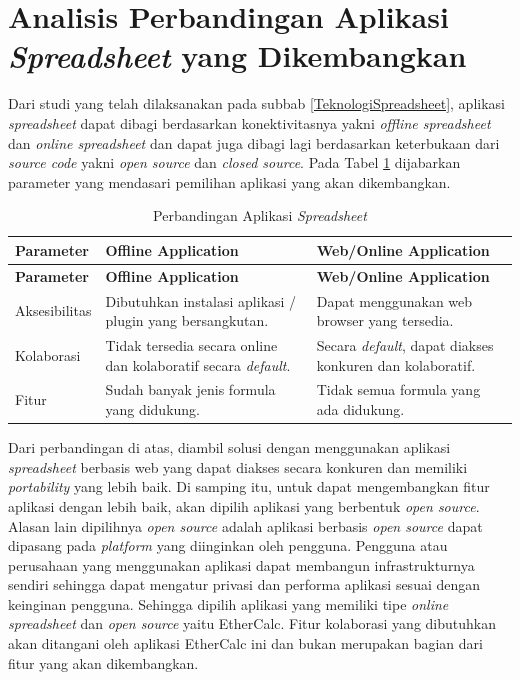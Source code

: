 \section{Analisis Perbandingan Aplikasi \textit{Spreadsheet} yang Dikembangkan}
Dari studi yang telah dilaksanakan pada subbab \ref{TeknologiSpreadsheet}, aplikasi \textit{spreadsheet} dapat dibagi berdasarkan konektivitasnya yakni \textit{offline spreadsheet} dan \textit{online spreadsheet} dan dapat juga dibagi lagi berdasarkan keterbukaan dari \textit{source code} yakni \textit{open source} dan \textit{closed source}. Pada Tabel \ref{AnalisisAplikasiDasar} dijabarkan parameter yang mendasari pemilihan aplikasi yang akan dikembangkan.

\begin{small}
\begin{longtable}{ | p{3cm} | p{4cm} | p{4cm} | }
    \caption{Perbandingan Aplikasi \textit{Spreadsheet}}
    \label{AnalisisAplikasiDasar}\\ \hline
    \centering\bfseries{Parameter} & \centering\bfseries{Offline Application} & \centering\bfseries{Web/Online Application} \tabularnewline \hline
    \endfirsthead
    \hline
    \centering\bfseries{Parameter} & \centering\bfseries{Offline Application} & \centering\bfseries{Web/Online Application} \tabularnewline \hline
    \endhead
    Aksesibilitas & Dibutuhkan instalasi aplikasi / plugin yang bersangkutan. & Dapat menggunakan web browser yang tersedia. \\ \hline
    Kolaborasi & Tidak tersedia secara online dan kolaboratif secara \textit{default}. & Secara \textit{default}, dapat diakses konkuren dan kolaboratif. \\ \hline
    Fitur & Sudah banyak jenis formula yang didukung. & Tidak semua formula yang ada didukung. \\ \hline
\end{longtable}
\end{small}

Dari perbandingan di atas, diambil solusi dengan menggunakan aplikasi \textit{spreadsheet} berbasis web yang dapat diakses secara konkuren dan memiliki \textit{portability} yang lebih baik. Di samping itu, untuk dapat mengembangkan fitur aplikasi dengan lebih baik, akan dipilih aplikasi yang berbentuk \textit{open source}. Alasan lain dipilihnya \textit{open source} adalah aplikasi berbasis \textit{open source} dapat dipasang pada \textit{platform} yang diinginkan oleh pengguna. Pengguna atau perusahaan yang menggunakan aplikasi dapat membangun infrastrukturnya sendiri sehingga dapat mengatur privasi dan performa aplikasi sesuai dengan keinginan pengguna. Sehingga dipilih aplikasi yang memiliki tipe \textit{online spreadsheet} dan \textit{open source} yaitu EtherCalc. Fitur kolaborasi yang dibutuhkan akan ditangani oleh aplikasi EtherCalc ini dan bukan merupakan bagian dari fitur yang akan dikembangkan.

